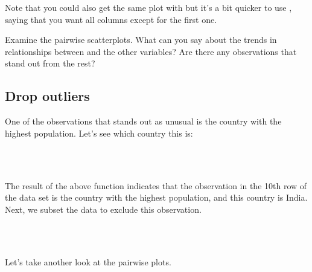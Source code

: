 \documentclass[11pt]{article}
\begin{document}
Note that you could also get the same plot with \texttt{\hlkeyword{(}\hlkeyword{[}\hlkeyword{,}\hlkeyword{:}\hlkeyword{]}\hlkeyword{)}} but it's a bit quicker to use \texttt{\hlkeyword{[}\hlkeyword{,}\hlkeyword{-}\hlkeyword{]}}, saying that you want all columns except for the first one.

\begin{exercise}
Examine the pairwise scatterplots. What can you say about the trends in relationships between \texttt{} and the other variables? Are there any observations that stand out from the rest?
\end{exercise}

\subsection*{Drop outliers}

One of the observations that stands out as unusual is the country with the highest population. Let's see which country this is:

\ttfamily\noindent
\hlstd{}\hspace*{\fill}\\
\hlstd{}\hlkeyword{(}\hlkeyword{\usebox{\hlnormalsizeboxdollar}}\hlkeyword{)}\hspace*{\fill}\\
\normalfont

The result of the above function indicates that the observation in the 10th row of the data set is the country with the highest population, and this country is India. Next, we subset the data to exclude this observation.

\ttfamily\noindent
\hlstd{}\hspace*{\fill}\\
\hlstd{}\hlassignement{=}{\ }\hlkeyword{(}\hlkeyword{,}{\ }\hlkeyword{!=}{\ }\hlkeyword{)}\hspace*{\fill}\\
\normalfont

Let's take another look at the pairwise plots.

\ttfamily\noindent
\hlstd{}\hspace*{\fill}\\
\hlstd{}\hlkeyword{(}\hlkeyword{[}\hlkeyword{,}\hlkeyword{-}\hlkeyword{]}\hlkeyword{)}\hspace*{\fill}\
\normalfont
\end{document}
